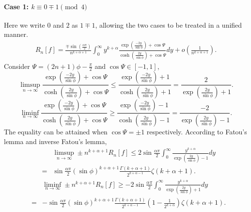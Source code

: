 \documentclass[11pt]{article}
\begin{document}
\paragraph{\bf{Case 1: $k\equiv 0\mp 1\pmod 4$}} Here we write $0$ and $2$ as $1 \mp 1$, allowing the two cases to be treated in a unified manner.
\begin{eqnarray}
        R_n[f] = \frac{\mp \sin(\frac{\alpha\pi}{2})}{ n^{k+\alpha+1}}\int_{0}^{\infty} y^{k+\alpha} \frac{  \exp\left(\frac{-2y}{\sin\phi}\right) + \cos \Psi }{\cosh\left(\frac{2y}{\sin\phi}\right) + \cos \Psi} dy +o(\frac{1}{n^{k+\alpha+1}}).
    \end{eqnarray}
Consider $\Psi = (2n+1)\phi - \frac{\pi}{2}$ and $\cos \Psi \in [-1,1]$,
\begin{equation}
    \limsup_{n \to \infty} \frac{  \exp\left(\frac{-2y}{\sin\phi}\right) + \cos \Psi }{\cosh\left(\frac{2y}{\sin\phi}\right) + \cos \Psi} \leq   \frac{  \exp\left(\frac{-2y}{\sin\phi}\right) +1 }{\cosh\left(\frac{2y}{\sin\phi}\right) +1} = \frac{  2 }{\exp\left(\frac{2y}{\sin\phi}\right) +1}.
\end{equation}
\begin{equation}
    \liminf_{n \to \infty} \frac{  \exp\left(\frac{-2y}{\sin\phi}\right) + \cos \Psi }{\cosh\left(\frac{2y}{\sin\phi}\right) + \cos \Psi} \geq   \frac{  \exp\left(\frac{-2y}{\sin\phi}\right) -1 }{\cosh\left(\frac{2y}{\sin\phi}\right) -1} = \frac{  -2 }{\exp\left(\frac{2y}{\sin\phi}\right) -1}.
\end{equation}
The equality can be attained when $\cos\Psi = \pm 1$ respectively. According to Fatou's lemma and inverse Fatou's lemma,
\begin{eqnarray}
    && \limsup_{n \to \infty} \pm n^{k+\alpha+1}R_n[f] \leq 2 \sin \frac{\alpha \pi}{2}  \int_0^\infty \frac{y^{k+\alpha} }{\exp\left(\frac{2y}{\sin \phi}\right) -1} dy \\
    &=&  \sin\frac{\alpha \pi}{2} (\sin \phi)^{k+\alpha+1}  \frac{\Gamma(k+\alpha+1)}{2^{k+\alpha-1}} \zeta(k+\alpha+1). \label{4l02_u}
\end{eqnarray}
\begin{eqnarray}
    &&\liminf_{n \to \infty} \pm n^{k+\alpha+1}R_n[f] \geq -2 \sin \frac{\alpha \pi}{2}  \int_0^\infty \frac{y^{k+\alpha} }{\exp\left(\frac{2y}{\sin \phi}\right) +1} dy \\
    &=&  -\sin\frac{\alpha \pi}{2} (\sin \phi)^{k+\alpha+1}  \frac{\Gamma(k+\alpha+1)}{2^{k+\alpha-1}}(1-\frac{1}{2^{k+\alpha}}) \zeta(k+\alpha+1). \label{4l02_l}
\end{eqnarray}
\end{document}
